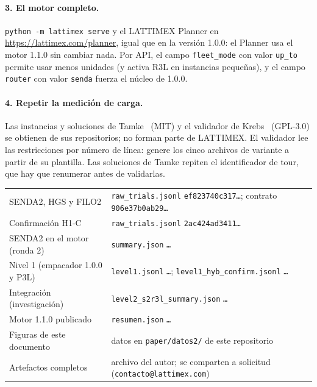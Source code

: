 \documentclass[11pt,a4paper]{article}
\newcommand{\sendados}{SENDA2}
\newcommand{\tsl}[1]{\texttt{\small #1}}
\begin{document}
\paragraph{3. El motor completo.} \tsl{python -m lattimex serve} y el LATTIMEX Planner en
\url{https://lattimex.com/planner}, igual que en la versión 1.0.0: el Planner usa el motor 1.1.0
sin cambiar nada. Por API, el campo \tsl{fleet\_mode} con valor \tsl{up\_to} permite usar menos
unidades (y activa R3L en instancias pequeñas), y el campo \tsl{router} con valor \tsl{senda} fuerza
el núcleo de 1.0.0.

\paragraph{4. Repetir la medición de carga.} Las instancias y soluciones de Tamke~\cite{tamkerepo}
(MIT) y el validador de Krebs~\cite{krebsvalidator} (GPL-3.0) se obtienen de sus repositorios; no
forman parte de LATTIMEX. El validador lee las restricciones por número de línea: genere los cinco
archivos de variante a partir de su plantilla. Las soluciones de Tamke repiten el identificador de
tour, que hay que renumerar antes de validarlas.

\begin{reproducir}[: artefactos]
\small
\begin{tabular}{@{}p{5.2cm}p{9.3cm}@{}}
\sendados, HGS y FILO2 & \tsl{raw\_trials.jsonl} \tsl{ef823740c317\ldots}; contrato \tsl{906e37b0ab29\ldots} \\
Confirmación H1-C & \tsl{raw\_trials.jsonl} \tsl{2ac424ad3411\ldots} \\
\sendados{} en el motor (ronda 2) & \tsl{summary.json} \tsl{\HashRondaDos\ldots} \\
Nivel 1 (empacador 1.0.0 y P3L) & \tsl{level1.jsonl} \tsl{\HashNivelUno\ldots}; \tsl{level1\_hyb\_confirm.jsonl} \tsl{\HashNivelUnoP\ldots} \\
Integración (investigación) & \tsl{level2\_s2r3l\_summary.json} \tsl{\HashSdosRtres\ldots} \\
Motor 1.1.0 publicado & \tsl{resumen.json} \tsl{\HashAocho\ldots} \\
Figuras de este documento & datos en \tsl{paper/datos2/} de este repositorio \\
Artefactos completos & archivo del autor; se comparten a solicitud (\tsl{contacto@lattimex.com}) \\
\end{tabular}
\end{reproducir}



\end{document}
